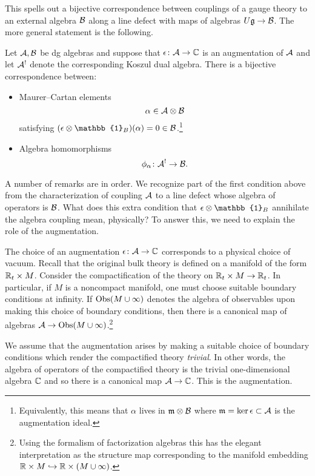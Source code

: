 \documentclass[11pt]{amsart}
\def\id{\mathbb{1}}
\begin{document}
This spells out a bijective correspondence between couplings of a gauge theory to an external algebra $\mathcal B$ along a line defect with maps of algebras $U \mathfrak g \to \mathcal B$. 
The more general statement is the following.  

\begin{prop}
\label{prop:kd}
Let $\mathcal A,\mathcal B$ be dg algebras and suppose that $\epsilon \colon \mathcal A \to \mathbb C$ is an augmentation of $\mathcal A$ and let $\mathcal A^!$ denote the corresponding Koszul dual algebra. 
There is a bijective correspondence between:
\begin{itemize}
\item Maurer--Cartan elements 
\[
\alpha \in \mathcal A \otimes \mathcal B 
\]
satisfying $(\ep \otimes \id_B) (\alpha) = 0 \in \cB$.\footnote{Equivalently, this means that $\alpha$ lives in $\mathfrak{m} \otimes \mathcal B$ where $\mathfrak{m} = \ker \epsilon \subset \mathcal A$ is the augmentation ideal.}
\item Algebra homomorphisms 
\[
\phi_\alpha \colon \mathcal A^! \to \mathcal B .
\]
\end{itemize}
\end{prop}

A number of remarks are in order. 
We recognize part of the first condition above from the characterization of coupling $\mathcal A$ to a line defect whose algebra of operators is $\mathcal B$.
What does this extra condition that $\ep \otimes \id_B$ annihilate the algebra coupling mean, physically? 
To answer this, we need to explain the role of the augmentation.

The choice of an augmentation $\epsilon \colon \mathcal A \to \mathbb C$ corresponds to a physical choice of vacuum. 
Recall that the original bulk theory is defined on a manifold of the form $\mathbb R_t \times M$. 
Consider the compactification of the theory on $\mathbb R_t \times M \rightarrow \mathbb R_t$. 
In particular, if $M$ is a noncompact manifold, one must choose suitable boundary conditions at infinity. 
If ${\rm Obs}(M \cup \infty)$ denotes the algebra of observables upon making this choice of boundary conditions, then there is a canonical map of algebras $\mathcal A \to {\rm Obs}(M \cup \infty)$.\footnote{Using the formalism of factorization algebras this has the elegant interpretation as the structure map corresponding to the manifold embedding $\mathbb R \times M \hookrightarrow \mathbb R \times (M \cup \infty)$.} 

We assume that the augmentation arises by making a suitable choice of boundary conditions which render the compactified theory {\em trivial}. 
In other words, the algebra of operators of the compactified theory is the trivial one-dimensional algebra $\mathbb C$ and so there is a canonical map $\mathcal A \to \mathbb C$.
This is the augmentation. 
\end{document}
